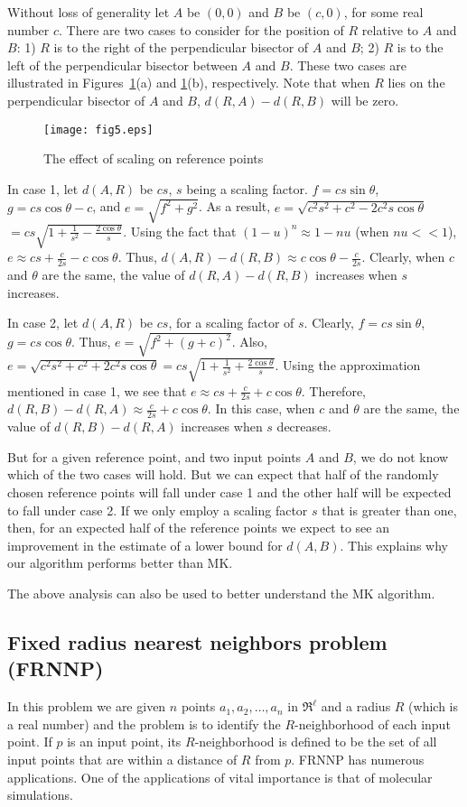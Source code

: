 \documentclass{article}
\theoremstyle{definition}
\theoremstyle{remark}
\begin{document}
Without loss of generality let $A$ be $(0,0)$ and $B$ be $(c,0)$, for some real number $c$. There are two cases to consider for the position of $R$ relative to $A$ and $B$: 1) $R$ is to the right of the perpendicular bisector of $A$ and $B$; 2) $R$ is to the left of the perpendicular bisector between $A$ and $B$. These two cases are illustrated in Figures~\ref{fig2}(a) and \ref{fig2}(b), respectively. Note that when $R$ lies on the perpendicular bisector of $A$ and $B$, $d(R,A)-d(R,B)$ will be zero.

\begin{figure}[h]
\texttt{[image: fig5.eps]}
\caption{The effect of scaling on reference points}\label{fig2}      \end{figure}

In case 1, let $d(A,R)$ be $cs$, $s$ being a scaling factor. $f=cs\sin\theta$, $g=cs\cos\theta-c$, and $e=\sqrt{f^2+g^2}$. As a result, $e=\sqrt{c^2s^2+c^2-2c^2s\cos\theta}$ $=cs\sqrt{1+\frac{1}{s^2}-\frac{2\cos\theta}{s}}$. Using the fact that $(1-u)^n\approx 1-nu$ (when $nu<<1$), $e\approx cs+\frac{c}{2s}-c\cos\theta$. Thus, $d(A,R)-d(R,B)\approx c\cos\theta-\frac{c}{2s}$. Clearly, when $c$ and $\theta$ are the same, the value of $d(R,A)-d(R,B)$ increases when $s$ increases.

In case 2, let $d(A,R)$ be $cs$, for a scaling factor of $s$. Clearly, $f=cs\sin\theta$, $g=cs\cos\theta$. Thus, $e=\sqrt{f^2+(g+c)^2}$. Also, $e=\sqrt{c^2s^2+c^2+2c^2s\cos\theta}=cs\sqrt{1+\frac{1}{s^2}+\frac{2\cos\theta}{s}}$. Using the approximation mentioned in case 1, we see that $e\approx cs+\frac{c}{2s}+c\cos\theta$. Therefore, $d(R,B)-d(R,A)\approx \frac{c}{2s}+c\cos\theta$. In this case, when $c$ and $\theta$ are the same, the value of $d(R,B)-d(R,A)$ increases when $s$ decreases.

But for a given reference point, and two input points $A$ and $B$, we do not know which of the two cases will hold. But we can expect that half of the randomly chosen reference points will fall under case 1 and the other half will be expected to fall under case 2. If we only employ a scaling factor $s$ that is greater than one, then, for an expected half of the reference points we expect to see an improvement in the estimate of a lower bound for $d(A,B)$. This explains why our algorithm performs better than MK.

The above analysis can also be used to better understand the MK algorithm.

\subsection{Fixed radius nearest neighbors problem (FRNNP)}
In this problem we are given $n$ points $a_1,a_2,\ldots,a_n$ in $\Re^\ell$ and a radius $R$ (which is a real number) and the problem is to identify the $R$-neighborhood of each input point. If $p$ is an input point, its $R$-neighborhood is defined to be the set of all input points that are within a distance of $R$ from $p$. FRNNP has numerous applications. One of the applications of vital importance is that of molecular simulations.
\end{document}
